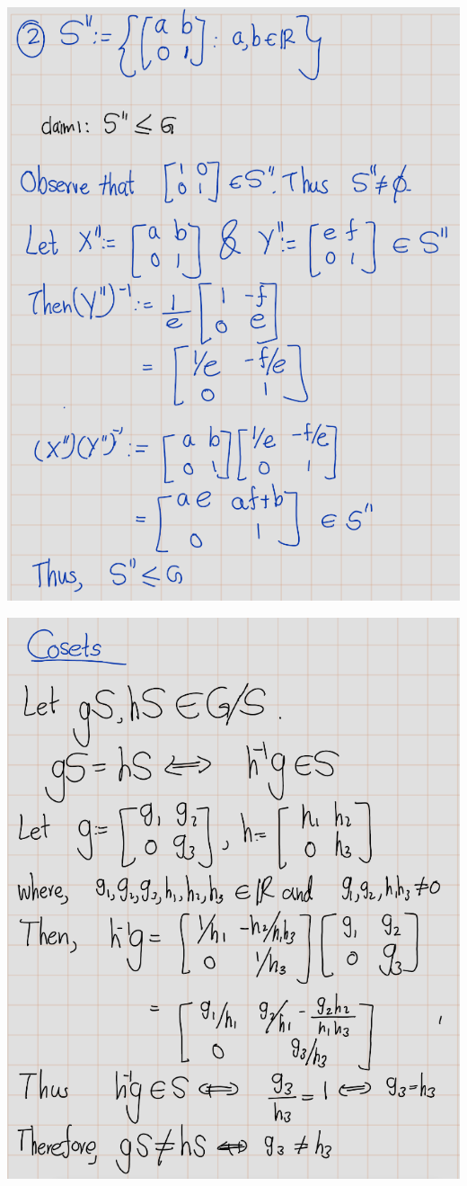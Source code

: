 \documentclass[
]{book}
\begin{document}
\includegraphics{figures/ch_2/fig42.png}

\includegraphics{figures/ch_2/fig43.png}
\end{document}
